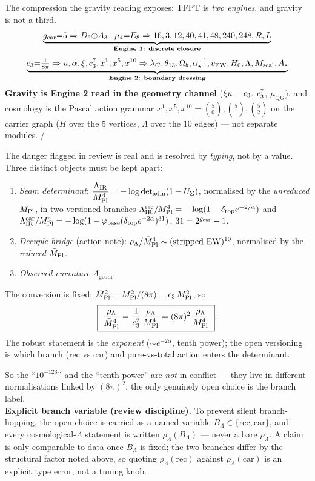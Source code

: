 \begin{winbox}
The compression the gravity reading exposes: TFPT is \emph{two engines}, and gravity is not a third.
\[
  \underbrace{g_{\mathrm{car}}{=}5\Rightarrow D_5{\oplus}A_3{+}\mu_4{=}E_8\Rightarrow16,3,12,40,41,48,240,248,R,L}_{\textbf{Engine 1: discrete closure}}
\]
\[
  \underbrace{c_3{=}\tfrac1{8\pi}\Rightarrow u,\alpha,\xi,c_3^7,x^1,x^5,x^{10}\Rightarrow\lambda_C,\theta_{13},\Omega_b,\alpha^{-1}_\star,v_{\mathrm{EW}},H_0,\Lambda,M_{\mathrm{scal}},A_s}_{\textbf{Engine 2: boundary dressing}}
\]
\textbf{Gravity is Engine 2 read in the geometry channel} ($\xi u=c_3$, $c_3^7$, $\mu_{\mathrm{QG}}$),
and cosmology is the Pascal action grammar $x^1,x^5,x^{10}=\binom50,\binom51,\binom52$ on the carrier
graph ($H$ over the $5$ vertices, $\Lambda$ over the $10$ edges) --- not separate modules. \mE/\mC
\end{winbox}
The danger flagged in review is real and is resolved by \emph{typing}, not by a value. Three distinct
objects must be kept apart:
\begin{proposition}
\label{prop:lambda}
\begin{enumerate}[leftmargin=1.6em]
\item \emph{Seam determinant}: $\dfrac{\Lambda_{\mathrm{IR}}}{M_{\mathrm{Pl}}^4}=-\log\det\nolimits_{\mathrm{adm}}(1-U_\Sigma)$,
  normalised by the \emph{unreduced} $M_{\mathrm{Pl}}$, in two versioned branches
  $\Lambda^{\mathrm{rec}}_{\mathrm{IR}}/M_{\mathrm{Pl}}^4=-\log(1-\delta_{\mathrm{top}}e^{-2/\alpha})$ and
  $\Lambda^{\mathrm{car}}_{\mathrm{IR}}/M_{\mathrm{Pl}}^4=-\log(1-\varphi_{\mathrm{base}}(\delta_{\mathrm{top}}e^{-2\alpha})^{31})$,
  $31=2^{g_{\mathrm{car}}}-1$.
\item \emph{Decuple bridge} (action note): $\rho_\Lambda/\bar M_{\mathrm{Pl}}^4\sim(\text{stripped EW})^{10}$, normalised
  by the \emph{reduced} $\bar M_{\mathrm{Pl}}$.
\item \emph{Observed curvature} $\Lambda_{\mathrm{geom}}$.
\end{enumerate}
The conversion is fixed: $\bar M_{\mathrm{Pl}}^2=M_{\mathrm{Pl}}^2/(8\pi)=c_3\,M_{\mathrm{Pl}}^2$, so
\[
  \boxed{\ \frac{\rho_\Lambda}{\Mbar^4}=\frac1{\cthree^2}\,\frac{\rho_\Lambda}{\Mpl^4}=(8\pi)^2\,\frac{\rho_\Lambda}{\Mpl^4}\ }.
\]
The robust statement is the \emph{exponent} ($\sim e^{-2\alpha}$, tenth power); the open versioning is
which branch (rec vs car) and pure-vs-total action enters the determinant. \mC
\end{proposition}

\noindent So the ``$10^{-123}$'' and the ``tenth power'' are \emph{not} in conflict --- they live in
different normalisations linked by $(8\pi)^2$; the only genuinely open choice is the branch label.
\smallskip\\
\noindent\textbf{Explicit branch variable (review discipline).} To prevent silent branch-hopping, the open
choice is carried as a named variable $B_\Lambda\in\{\mathrm{rec},\mathrm{car}\}$, and every cosmological-$\Lambda$
statement is written $\rho_\Lambda(B_\Lambda)$ --- never a bare $\rho_\Lambda$. A claim is only comparable to
data once $B_\Lambda$ is fixed; the two branches differ by the structural factor noted above, so quoting
$\rho_\Lambda(\mathrm{rec})$ against $\rho_\Lambda(\mathrm{car})$ is an explicit type error, not a tuning knob.

